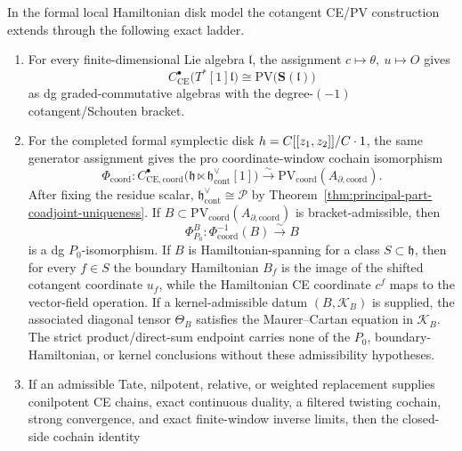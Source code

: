 \documentclass[11pt]{memoir}
\begin{document}
\begin{thm}
  \label{thm:universal-ce-pv-koszul-criterion}
  In the formal local Hamiltonian disk model the cotangent CE/PV
  construction extends through the following exact ladder.
  \begin{enumerate}
    \item For every finite-dimensional Lie algebra \(\mathfrak l\), the
      assignment \(c\mapsto\theta,\ u\mapsto O\) gives
      \[
        C^\bullet_{\mathrm{CE}}\bigl(T^*[1]\mathfrak l\bigr)
        \cong
        \mathrm{PV}\bigl(\mathbf S(\mathfrak l)\bigr)
      \]
	      as dg graded-commutative algebras with the degree-\((-1)\)
	      cotangent/Schouten bracket.
    \item For the completed formal symplectic disk
      \(h=C[[z_1,z_2]]/C\cdot1\), the same generator
			      assignment gives the pro coordinate-window cochain
		      isomorphism
      \[
		        \Phi_{\mathrm{coord}}\colon
        C^\bullet_{\mathrm{CE},\mathrm{coord}}
        \bigl(\mathfrak h\ltimes
          \mathfrak h^\vee_{\mathrm{cont}}[1]\bigr)
        \xrightarrow{\sim}
		        \mathrm{PV}_{\mathrm{coord}}(A_{\partial,\mathrm{coord}}).
		      \]
      After fixing the residue scalar,
      \(\mathfrak h^\vee_{\mathrm{cont}}\cong\mathcal P\) by
      Theorem~\ref{thm:principal-part-coadjoint-uniqueness}.  If
      \(B\subset\mathrm{PV}_{\mathrm{coord}}(A_{\partial,\mathrm{coord}})\)
      is bracket-admissible, then
      \[
        \Phi^B_{P_0}\colon\Phi_{\mathrm{coord}}^{-1}(B)
        \xrightarrow{\sim}B
      \]
      is a dg \(P_0\)-isomorphism.  If \(B\) is Hamiltonian-spanning for a
      class \(S\subset\mathfrak h\), then for every \(f\in S\) the
      boundary Hamiltonian \(B_f\) is the image of the shifted cotangent
      coordinate \(u_f\), while the Hamiltonian CE coordinate \(c^f\) maps
      to the vector-field operation.  If a kernel-admissible datum
      \((B,\mathcal K_B)\) is supplied, the associated diagonal tensor
      \(\Theta_B\) satisfies the Maurer--Cartan equation in
      \(\mathcal K_B\).  The strict product/direct-sum endpoint carries
      none of the \(P_0\), boundary-Hamiltonian, or kernel conclusions
      without these admissibility hypotheses.
	    \item If an admissible Tate, nilpotent, relative, or weighted
	      replacement supplies conilpotent CE chains, exact continuous
	      duality, a filtered twisting cochain, strong convergence, and exact
	      finite-window inverse limits, then the closed-side cochain identity

\end{enumerate}
\end{thm}
\end{document}
